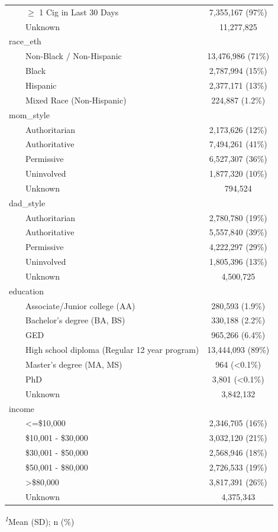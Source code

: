 \documentclass[
]{article}
\begin{document}
\begin{table}[t]
\begin{tabular*}{\linewidth}{@{\extracolsep{\fill}}lc}
    \ensuremath{\geq} 1 Cig in Last 30 Days & 7,355,167 (97\%) \\ 
    Unknown & 11,277,825 \\ 
race\_eth &  \\ 
    Non-Black / Non-Hispanic & 13,476,986 (71\%) \\ 
    Black & 2,787,994 (15\%) \\ 
    Hispanic & 2,377,171 (13\%) \\ 
    Mixed Race (Non-Hispanic) & 224,887 (1.2\%) \\ 
mom\_style &  \\ 
    Authoritarian & 2,173,626 (12\%) \\ 
    Authoritative & 7,494,261 (41\%) \\ 
    Permissive & 6,527,307 (36\%) \\ 
    Uninvolved & 1,877,320 (10\%) \\ 
    Unknown & 794,524 \\ 
dad\_style &  \\ 
    Authoritarian & 2,780,780 (19\%) \\ 
    Authoritative & 5,557,840 (39\%) \\ 
    Permissive & 4,222,297 (29\%) \\ 
    Uninvolved & 1,805,396 (13\%) \\ 
    Unknown & 4,500,725 \\ 
education &  \\ 
    Associate/Junior college (AA) & 280,593 (1.9\%) \\ 
    Bachelor's degree (BA, BS) & 330,188 (2.2\%) \\ 
    GED & 965,266 (6.4\%) \\ 
    High school diploma (Regular 12 year program) & 13,444,093 (89\%) \\ 
    Master's degree (MA, MS) & 964 (<0.1\%) \\ 
    PhD & 3,801 (<0.1\%) \\ 
    Unknown & 3,842,132 \\ 
income &  \\ 
    <=\$10,000 & 2,346,705 (16\%) \\ 
    \$10,001 - \$30,000 & 3,032,120 (21\%) \\ 
    \$30,001 - \$50,000 & 2,568,946 (18\%) \\ 
    \$50,001 - \$80,000 & 2,726,533 (19\%) \\ 
    >\$80,000 & 3,817,391 (26\%) \\ 
    Unknown & 4,375,343 \\ 
\bottomrule
\end{tabular*}
\begin{minipage}{\linewidth}
\textsuperscript{\textit{1}}Mean (SD); n (\%)\\
\end{minipage}
\end{table}
\end{document}
